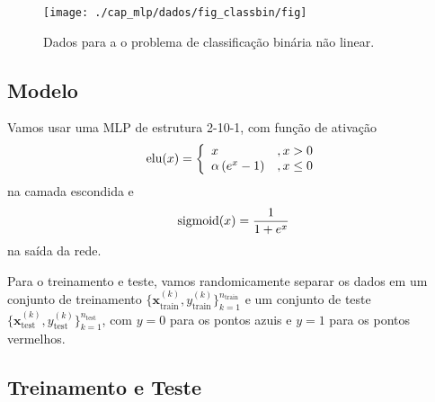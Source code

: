 \begin{figure}[H]
  \centering
  \texttt{[image: ./cap\_mlp/dados/fig\_classbin/fig]}
  \caption{Dados para a o problema de classificação binária não linear.}
  \label{cap_mlp_sec_classbin:fig:dados}
\end{figure}

\subsection{Modelo}
\badgeConstrucao

Vamos usar uma MLP de estrutura 2-10-1, com função de ativação
\begin{equation}
  \operatorname{elu}(x) = \left\{
    \begin{array}{ll}
      x &, x > 0\\
      \alpha\left(e^x - 1\right) &, x \leq 0
    \end{array}
\right.
\end{equation}
na camada escondida e
\begin{equation}
  \operatorname{sigmoid}(x) = \frac{1}{1 + e^x}
\end{equation}
na saída da rede.

Para o treinamento e teste, vamos randomicamente separar os dados em um conjunto de treinamento $\{\pmb{x}_{\text{train}}^{(k)}, y_{\text{train}}^{(k)}\}_{k=1}^{n_{\text{train}}}$ e um conjunto de teste $\{\pmb{x}_{\text{test}}^{(k)}, y_{\text{test}}^{(k)}\}_{k=1}^{n_{\text{test}}}$, com $y=0$ para os pontos azuis e $y=1$ para os pontos vermelhos.

\subsection{Treinamento e Teste}
\badgeConstrucao

